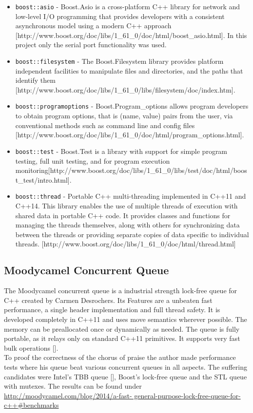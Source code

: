 \begin{itemize}
\item \texttt{boost::asio} - Boost.Asio is a cross-platform C++ library for network and low-level I/O programming that provides developers with a consistent asynchronous model using a modern C++ approach [http://www.boost.org/doc/libs/1\_61\_0/doc/html/boost\_asio.html]. In this project only the serial port functionality was used.
\item \texttt{boost::filesystem} - The Boost.Filesystem library provides platform independent facilities to manipulate files and directories, and the paths that identify them [http://www.boost.org/doc/libs/1\_61\_0/libs/filesystem/doc/index.htm].
\item \texttt{boost::programoptions} - Boost.Program\_options allows program developers to obtain program options, that is (name, value) pairs from the user, via conventional methods such as command line and config files [http://www.boost.org/doc/libs/1\_61\_0/doc/html/program\_options.html]. 
\item \texttt{boost::test} - Boost.Test is a library with support for simple program testing, full unit testing, and for program execution monitoring[http://www.boost.org/doc/libs/1\_61\_0/libs/test/doc/html/boost\_test/intro.html].
\item \texttt{boost::thread} - Portable C++ multi-threading implemented in C++11 and C++14. This library  enables the use of multiple threads of execution with shared data in portable C++ code. It provides classes and functions for managing the threads themselves, along with others for synchronizing data between the threads or providing separate copies of data specific to individual threads. [http://www.boost.org/doc/libs/1\_61\_0/doc/html/thread.html]
\end{itemize}
\subsection{Moodycamel Concurrent Queue}
The Moodycamel concurrent queue is a industrial strength lock-free queue for C++ created by Carmen Desrochers. Its Features are a unbeaten fast performance, a single header implementation and full thread safety. It is developed completely in C++11 and uses move semantics wherever possible. The memory can be preallocated once or dynamically as needed. The queue is fully portable, as it relays only on standard C++11 primitives. It supports very fast bulk operations [].\\
To proof the correctness of the chorus of praise the author made performance tests where his queue beat various concurrent queues in all aspects. The suffering candidates were Intel's TBB queue [], Boost's lock-free queue and the STL queue with mutexes. The results can be found under \url{http://moodycamel.com/blog/2014/a-fast-
general-purpose-lock-free-queue-for-c++#benchmarks}

